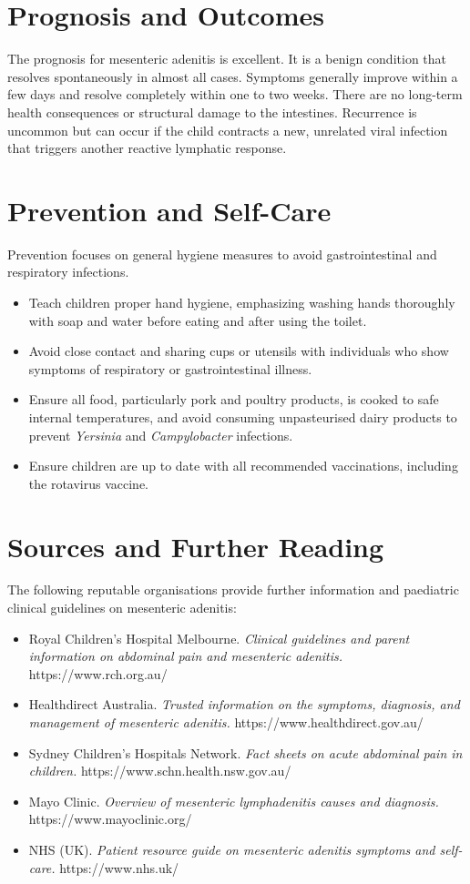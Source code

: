 \section*{Prognosis and Outcomes}
The prognosis for mesenteric adenitis is excellent. It is a benign condition that resolves spontaneously in almost all cases. Symptoms generally improve within a few days and resolve completely within one to two weeks. There are no long-term health consequences or structural damage to the intestines. Recurrence is uncommon but can occur if the child contracts a new, unrelated viral infection that triggers another reactive lymphatic response.

\section*{Prevention and Self-Care}
Prevention focuses on general hygiene measures to avoid gastrointestinal and respiratory infections.
\begin{itemize}
    \item Teach children proper hand hygiene, emphasizing washing hands thoroughly with soap and water before eating and after using the toilet.
    \item Avoid close contact and sharing cups or utensils with individuals who show symptoms of respiratory or gastrointestinal illness.
    \item Ensure all food, particularly pork and poultry products, is cooked to safe internal temperatures, and avoid consuming unpasteurised dairy products to prevent \textit{Yersinia} and \textit{Campylobacter} infections.
    \item Ensure children are up to date with all recommended vaccinations, including the rotavirus vaccine.
\end{itemize}

\section*{Sources and Further Reading}
The following reputable organisations provide further information and paediatric clinical guidelines on mesenteric adenitis:
\begin{itemize}
    \item Royal Children's Hospital Melbourne. \textit{Clinical guidelines and parent information on abdominal pain and mesenteric adenitis.} https://www.rch.org.au/
    \item Healthdirect Australia. \textit{Trusted information on the symptoms, diagnosis, and management of mesenteric adenitis.} https://www.healthdirect.gov.au/
    \item Sydney Children's Hospitals Network. \textit{Fact sheets on acute abdominal pain in children.} https://www.schn.health.nsw.gov.au/
    \item Mayo Clinic. \textit{Overview of mesenteric lymphadenitis causes and diagnosis.} https://www.mayoclinic.org/
    \item NHS (UK). \textit{Patient resource guide on mesenteric adenitis symptoms and self-care.} https://www.nhs.uk/
\end{itemize}
